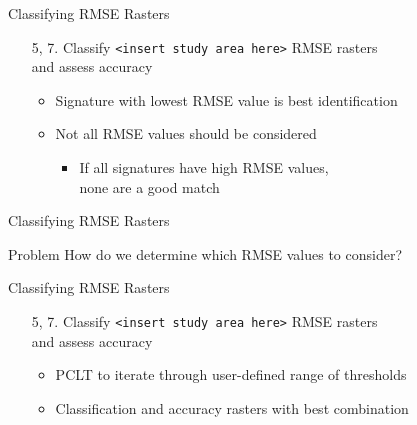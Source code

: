 \documentclass[draft,compress]{beamer}
\begin{document}
\begin{frame}{Classifying RMSE Rasters}
\begin{enumerate}
  \item[5, 7.] Classify {\footnotesize\texttt{<insert study area here>}} RMSE rasters\\and assess accuracy
  \begin{itemize}
    \item<2-> Signature with lowest RMSE value is best identification
    \item<3-> Not all RMSE values should be considered
    \begin{itemize}
      \item<4-> If all signatures have high RMSE values,\\none are a good match
    \end{itemize}
  \end{itemize}
\end{enumerate}
\end{frame}

\begin{frame}{Classifying RMSE Rasters}
\begin{alertblock}{Problem}
  How do we determine which RMSE values to consider?
\end{alertblock}
\end{frame}

\begin{frame}{Classifying RMSE Rasters}
\begin{enumerate}
  \item[5, 7.] Classify {\footnotesize\texttt{<insert study area here>}} RMSE rasters\\and assess accuracy
  \begin{itemize}
    \item<2-> PCLT to iterate through user-defined range of thresholds
    \item<3-> Classification and accuracy rasters with best combination
  \end{itemize}
\end{enumerate}
\end{frame}
\end{document}
